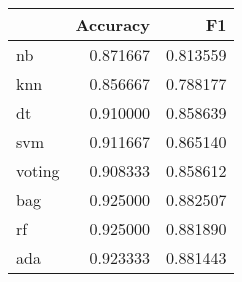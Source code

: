 \begin{tabular}{lrr}
\toprule
{} &  Accuracy &        F1 \\
\midrule
nb     &  0.871667 &  0.813559 \\
knn    &  0.856667 &  0.788177 \\
dt     &  0.910000 &  0.858639 \\
svm    &  0.911667 &  0.865140 \\
voting &  0.908333 &  0.858612 \\
bag    &  0.925000 &  0.882507 \\
rf     &  0.925000 &  0.881890 \\
ada    &  0.923333 &  0.881443 \\
\bottomrule
\end{tabular}
